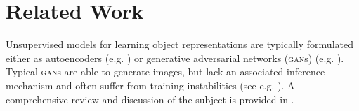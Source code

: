 \documentclass{article}
\begin{document}
\section{Related Work}

Unsupervised models for learning object representations are typically formulated either as autoencoders (e.g. \cite{huang2015efficient,eslami2016attend,kosiorek2018sqair,xu2018multi,crawford2019spatially,greff2016tagger,greff2017neural,van2018relational,burgess2019monet,greff2019multi,kosiorek2019stacked,veerapaneni2020entity,engelcke2020genesis,engelcke2020reconstruction,anciukevicius2020object,lin2020space,jiang2020scalor,yang2020learning,bear2020learning,locatello2020object,jiang2020generative}) or generative adversarial networks (\textsc{gan}s) (e.g. \cite{van2018case,chen2019unsupervised,bielski2019emergence,arandjelovic2019object,azadi2019compositional,nguyen2020blockgan,ehrhardt2020relate,niemeyer2020giraffe}).
Typical \textsc{gan}s are able to generate images, but lack an associated inference mechanism and often suffer from training instabilities (see e.g. \cite{goodfellow2014generative,brock2018large}).
A comprehensive review and discussion of the subject is provided in \citet{greff2020binding}.
\end{document}
